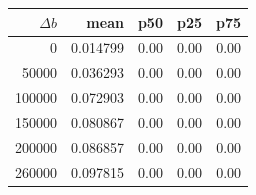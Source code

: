 \begin{tabular}{rrrrr}\hline
$\Delta b$ & mean & p50 & p25 & p75 \\ \hline
0 & 0.014799 & 0.00 & 0.00 & 0.00 \\ 
50000 & 0.036293 & 0.00 & 0.00 & 0.00 \\ 
100000 & 0.072903 & 0.00 & 0.00 & 0.00 \\ 
150000 & 0.080867 & 0.00 & 0.00 & 0.00 \\ 
200000 & 0.086857 & 0.00 & 0.00 & 0.00 \\ 
260000 & 0.097815 & 0.00 & 0.00 & 0.00 \\ 
\hline\end{tabular}
